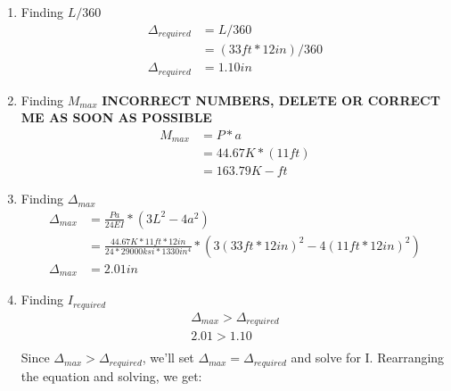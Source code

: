 \documentclass{report} %
\begin{document}
\begin{enumerate}
    \item Finding $L/360$
        \begin{equation*}
            \begin{aligned}
                \Delta _{required} &= L/360 \\
                            &= (33ft * 12in)/360\\
                \Delta _{required} &= 1.10in    
            \end{aligned}
        \end{equation*}
    \item Finding $M_{max}$ \textbf{INCORRECT NUMBERS, DELETE OR CORRECT ME AS SOON AS POSSIBLE}
        \begin{equation*}
            \begin{aligned}
                M_{max} &= P * a \\
                        &= 44.67K * (11ft) \\  %
                        &= 163.79 K-ft
            \end{aligned}
        \end{equation*} 
    \item Finding $\Delta _{max}$
        \begin{equation*}
            \begin{aligned}
                \Delta _{max} &= \frac{Pa}{24EI} * (3L^2-4a^2)\\ %
                        &= \frac{44.67K * 11ft * 12in}{24 * 29000ksi * 1330in^4} * (3(33ft * 12in)^2-4(11ft * 12in)^2) \\
                \Delta _{max} &= 2.01in    
            \end{aligned}
        \end{equation*}
    \item Finding $I_{required}$
        \begin{equation*}
            \begin{aligned}
                \Delta _{max} > \Delta _{required} \\
                2.01 > 1.10 \\
            \end{aligned}
        \end{equation*}
        Since $\Delta _{max} > \Delta _{required}$, we'll set $\Delta _{max} = \Delta _{required}$ and solve for I. Rearranging the equation and solving, we get:

\end{enumerate}
\end{document}
